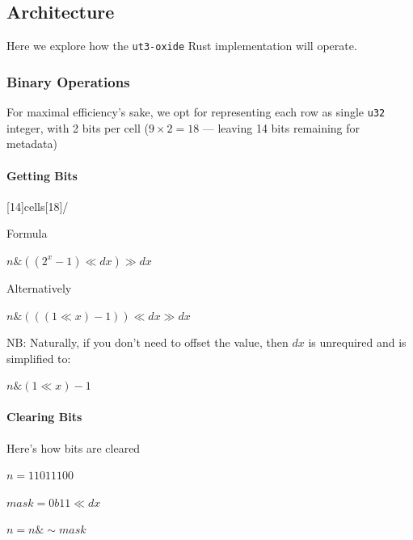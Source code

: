 \subsection{Architecture}
Here we explore how the \verb|ut3-oxide| Rust implementation will operate.

\subsubsection{Binary Operations}
For maximal efficiency's sake, we opt for representing each row as single 
\verb|u32| integer, with 2 bits per cell ($9 \times 2 = 18$ — leaving 14 bits remaining for metadata)
\paragraph{Getting Bits}
\begin{center}
    [14]{cells}[18]/
\end{center}

Formula
\begin{center}
    \begin{math}
        n \& ((2^x - 1) \ll dx) \gg dx
    \end{math}
\end{center}

Alternatively
\begin{center}
\begin{math}
    n \operatorname{\&} (((1 \ll x) - 1)) \ll dx \gg dx
\end{math}
\end{center}

NB: Naturally, if you don't need to offset the value, then $dx$ is unrequired and is simplified to:

\begin{center}
    \begin{math}
        n \operatorname{\&} (1 \ll x) - 1
    \end{math}
\end{center}

\paragraph{Clearing Bits}
Here's how bits are cleared
\begin{center}
    $n = 1101 1100$
    

    $mask = 0b11 \ll dx$
    
    
    $n = n \operatorname{\&} \operatorname{\sim} mask$
\end{center}

